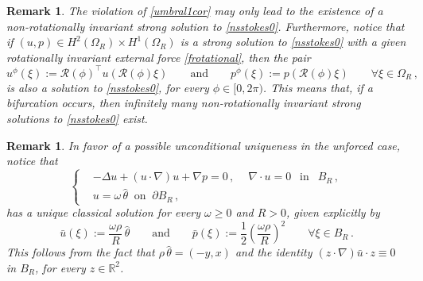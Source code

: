 \documentclass[a4paper,11pt]{article}
\newtheorem{remark}[theorem]{Remark}
\numberwithin{equation}{section}
\numberwithin{figure}{section}
\begin{document}
\begin{remark} \label{infinitas}
The violation of \eqref{umbral1cor} may only lead to the existence of a non-rotationally invariant strong solution to \eqref{nsstokes0}.
Furthermore, notice that if
$(u,p) \in H^2(\Omega_{R})\times H^1(\Omega_{R})$ is a strong solution to \eqref{nsstokes0} with a given rotationally invariant external force
\eqref{frotational}, then the pair
\begin{equation}\label{rotinv}
u^{\phi}(\xi) := \mathcal{R}(\phi)^{\top} u(\mathcal{R}(\phi) \xi) \qquad \text{and} \qquad p^{\phi}(\xi) := p(\mathcal{R}(\phi) \xi)
\qquad \forall \xi \in \Omega_{R} \, ,
\end{equation}
is also a solution to \eqref{nsstokes0}, for every $\phi \in [0,2 \pi)$. This means that, if a bifurcation occurs, then infinitely many
non-rotationally invariant strong solutions to \eqref{nsstokes0} exist.
\end{remark}

\begin{remark}
In favor of a possible unconditional uniqueness in the unforced case, notice that
	\begin{equation}\label{nsstokes0br}
	\left\{
	\begin{aligned}
	& -\Delta u+(u\cdot\nabla)u+\nabla p=0 \, ,\ \quad  \nabla\cdot u=0 \ \ \mbox{ in } \ \ B_{R} \, , \\[3pt]
	& u = \omega \, \widehat{\theta} \ \text{ on } \ \partial B_R \, ,
	\end{aligned}
	\right.
	\end{equation}
	has a unique classical solution for every $\omega \geq 0$ and $R>0$, given explicitly by
	$$
	\bar{u}(\xi) := \dfrac{\omega \rho}{R} \, \widehat{\theta} \qquad \text{and} \qquad \bar{p}(\xi) := \dfrac{1}{2} \left( \dfrac{\omega \rho}{R} \right)^{2} \qquad \forall \xi \in B_{R} \, .
	$$
This follows from the fact that $\rho \, \widehat{\theta}=(-y,x)$ and the identity $(z \cdot \nabla) \bar{u} \cdot z \equiv 0$ in $B_{R}$, for every $z \in \mathbb{R}^{2}$.
\end{remark}
\end{document}
